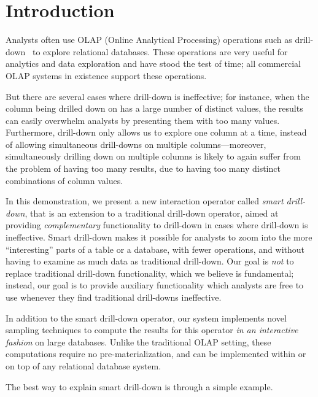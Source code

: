 
\section{Introduction} \label{sec:intro} 

Analysts often use OLAP (Online Analytical Processing) operations
such as drill-down~\cite{export:69578} to explore
relational databases. 
These operations are very useful for analytics and data exploration and have stood the test of time;
all commercial OLAP systems 
in existence support these operations.

But there are several cases where drill-down is ineffective; 
for instance, when the column being drilled down on has a large number of distinct values,
the results can easily overwhelm analysts by presenting them with too many 
values. Furthermore, drill-down only allows us to explore one column at a time, instead of allowing simultaneous drill-downs
on multiple columns---moreover, simultaneously drilling down on multiple columns 
is likely to again suffer from the problem
of having too many results, due to having too many distinct combinations of column values.

In this demonstration, we present a new interaction operator called {\em smart drill-down}, 
that is an extension to a traditional 
drill-down operator, aimed at providing {\em complementary}
functionality to drill-down in cases where drill-down is
ineffective. Smart drill-down makes it possible for analysts to zoom into
the more ``interesting'' parts of a table or a database,
with fewer operations, and without having to examine as much
data as traditional drill-down.
Our goal is {\em not} to replace traditional 
drill-down functionality, which we believe is fundamental;
instead, our goal is to provide auxiliary functionality 
which analysts are free to use whenever they find 
traditional drill-downs ineffective.

In addition to the smart drill-down operator, our system implements novel sampling techniques to compute the results for this
operator {\em in an interactive fashion} on large databases. 
Unlike the traditional OLAP setting, these computations 
require no pre-materialization, and can be implemented 
within or on top of any relational database system.

The best way to explain smart drill-down is through a simple example.

